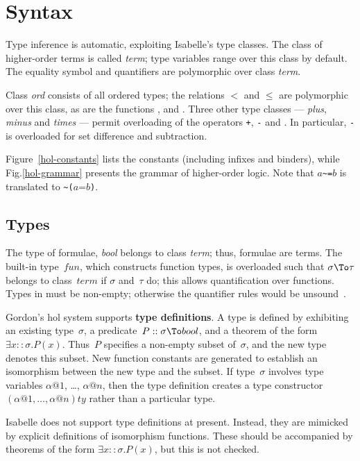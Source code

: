 \section{Syntax}
Type inference is automatic, exploiting Isabelle's type classes.  The class
of higher-order terms is called {\it term\/}; type variables range over
this class by default.  The equality symbol and quantifiers are polymorphic
over class {\it term}.  

Class {\it ord\/} consists of all ordered types; the relations $<$ and
$\leq$ are polymorphic over this class, as are the functions
,  and .  Three other
type classes --- {\it plus}, {\it minus\/} and {\it times} --- permit
overloading of the operators {\tt+}, {\tt-} and {\tt*}.  In particular,
{\tt-} is overloaded for set difference and subtraction.

Figure~\ref{hol-constants} lists the constants (including infixes and
binders), while Fig.\ts \ref{hol-grammar} presents the grammar of
higher-order logic.  Note that $a$\verb|~=|$b$ is translated to
\verb|~(|$a$=$b$\verb|)|.

\subsection{Types}\label{HOL-types}
The type of formulae, {\it bool} belongs to class {\it term}; thus,
formulae are terms.  The built-in type~$fun$, which constructs function
types, is overloaded such that $\sigma\To\tau$ belongs to class~$term$ if
$\sigma$ and~$\tau$ do; this allows quantification over functions.  Types
in {\HOL} must be non-empty; otherwise the quantifier rules would be
unsound~\cite[\S7]{paulson-COLOG}.

Gordon's {\sc hol} system supports {\bf type definitions}.  A type is
defined by exhibiting an existing type~$\sigma$, a predicate~$P::\sigma\To
bool$, and a theorem of the form $\exists x::\sigma.P(x)$.  Thus~$P$
specifies a non-empty subset of~$\sigma$, and the new type denotes this
subset.  New function constants are generated to establish an isomorphism
between the new type and the subset.  If type~$\sigma$ involves type
variables $\alpha@1$, \ldots, $\alpha@n$, then the type definition creates
a type constructor $(\alpha@1,\ldots,\alpha@n)ty$ rather than a particular
type.

Isabelle does not support type definitions at present.  Instead, they are
mimicked by explicit definitions of isomorphism functions.  These should be
accompanied by theorems of the form $\exists x::\sigma.P(x)$, but this is
not checked.


